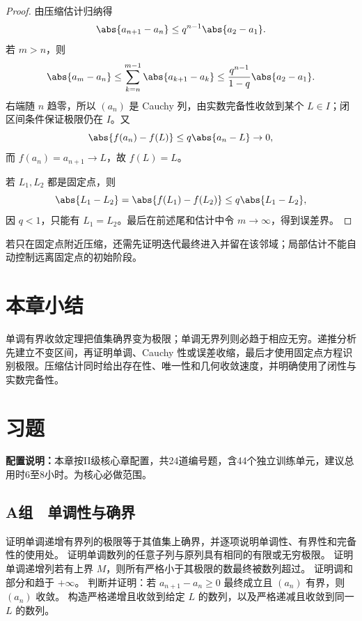 \begin{proof}
由压缩估计归纳得
\[
 \abs{a_{n+1}-a_n}\le q^{n-1}\abs{a_2-a_1}.
\]
若 \(m>n\)，则
\[
 \abs{a_m-a_n}
 \le\sum_{k=n}^{m-1}\abs{a_{k+1}-a_k}
 \le\frac{q^{n-1}}{1-q}\abs{a_2-a_1}.
\]
右端随 \(n\) 趋零，所以 \((a_n)\) 是 Cauchy 列，由实数完备性收敛到某个 \(L\in I\)；闭区间条件保证极限仍在 \(I\)。又
\[
 \abs{f(a_n)-f(L)}\le q\abs{a_n-L}\to0,
\]
而 \(f(a_n)=a_{n+1}\to L\)，故 \(f(L)=L\)。

若 \(L_1,L_2\) 都是固定点，则
\[
 \abs{L_1-L_2}=\abs{f(L_1)-f(L_2)}
 \le q\abs{L_1-L_2},
\]
因 \(q<1\)，只能有 \(L_1=L_2\)。最后在前述尾和估计中令 \(m\to\infty\)，得到误差界。
\end{proof}

若只在固定点附近压缩，还需先证明迭代最终进入并留在该邻域；局部估计不能自动控制远离固定点的初始阶段。

\section*{本章小结}

单调有界收敛定理把值集确界变为极限；单调无界列则必趋于相应无穷。递推分析先建立不变区间，再证明单调、Cauchy 性或误差收缩，最后才使用固定点方程识别极限。压缩估计同时给出存在性、唯一性和几何收敛速度，并明确使用了闭性与实数完备性。

\section*{习题}

\noindent\textbf{配置说明：}本章按II级核心章配置，共24道编号题，含44个独立训练单元，建议总用时6至8小时。为核心必做范围。

\subsection*{A组　单调性与确界}
\begin{enumerate}[label=\textbf{10.\arabic*.}]
  \mustdo 证明单调递增有界列的极限等于其值集上确界，并逐项说明单调性、有界性和完备性的使用处。
  \mustdo 证明单调数列的任意子列与原列具有相同的有限或无穷极限。
  \mustdo 证明单调递增列若有上界 \(M\)，则所有严格小于其极限的数最终被数列超过。
  \mustdo 证明调和部分和趋于 \(+\infty\)。
  \mustdo 判断并证明：若 \(a_{n+1}-a_n\ge0\) 最终成立且 \((a_n)\) 有界，则 \((a_n)\) 收敛。
  \mustdo 构造严格递增且收敛到给定 \(L\) 的数列，以及严格递减且收敛到同一 \(L\) 的数列。
\end{enumerate}

